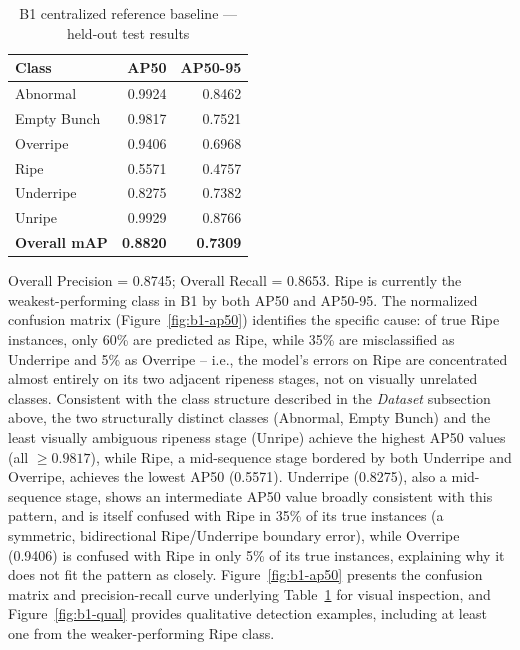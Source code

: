 \documentclass[11pt]{article}
\begin{document}
\begin{table}[H]
  \centering
  \caption{B1 centralized reference baseline --- held-out test results}
  \label{tab:b1}
  \begin{tabular}{lrr}
    \toprule
    Class & AP50 & AP50-95 \\
    \midrule
    Abnormal     & 0.9924 & 0.8462 \\
    Empty Bunch  & 0.9817 & 0.7521 \\
    Overripe     & 0.9406 & 0.6968 \\
    Ripe         & 0.5571 & 0.4757 \\
    Underripe    & 0.8275 & 0.7382 \\
    Unripe       & 0.9929 & 0.8766 \\
    \midrule
    \textbf{Overall mAP} & \textbf{0.8820} & \textbf{0.7309} \\
    \bottomrule
  \end{tabular}
\end{table}

Overall Precision = 0.8745; Overall Recall = 0.8653. Ripe is currently the weakest-performing class in B1 by both AP50 and AP50-95. The normalized confusion matrix (Figure~\ref{fig:b1-ap50}) identifies the specific cause: of true Ripe instances, only 60\% are predicted as Ripe, while 35\% are misclassified as Underripe and 5\% as Overripe -- i.e., the model's errors on Ripe are concentrated almost entirely on its two adjacent ripeness stages, not on visually unrelated classes. Consistent with the class structure described in the \emph{Dataset} subsection above, the two structurally distinct classes (Abnormal, Empty Bunch) and the least visually ambiguous ripeness stage (Unripe) achieve the highest AP50 values (all $\ge 0.9817$), while Ripe, a mid-sequence stage bordered by both Underripe and Overripe, achieves the lowest AP50 (0.5571). Underripe (0.8275), also a mid-sequence stage, shows an intermediate AP50 value broadly consistent with this pattern, and is itself confused with Ripe in 35\% of its true instances (a symmetric, bidirectional Ripe/Underripe boundary error), while Overripe (0.9406) is confused with Ripe in only 5\% of its true instances, explaining why it does not fit the pattern as closely. Figure~\ref{fig:b1-ap50} presents the confusion matrix and precision-recall curve underlying Table~\ref{tab:b1} for visual inspection, and Figure~\ref{fig:b1-qual} provides qualitative detection examples, including at least one from the weaker-performing Ripe class.
\end{document}
